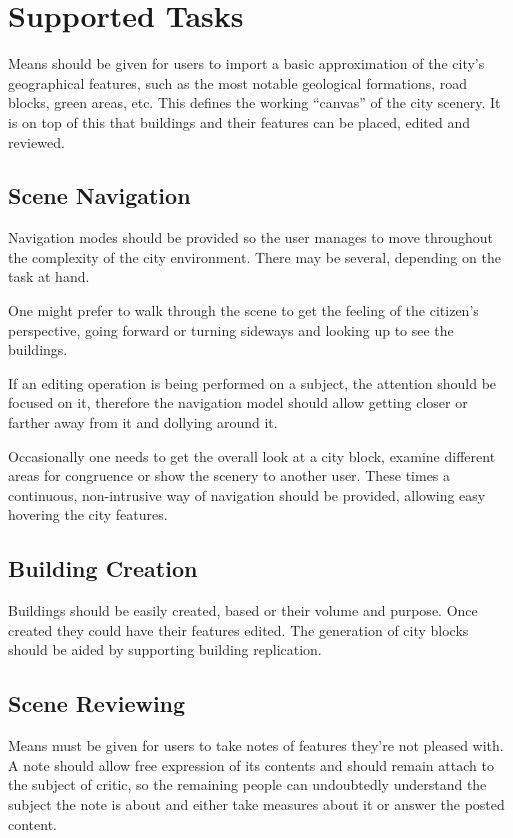

\section{Supported Tasks}

Means should be given for users to import a basic approximation of the
city's geographical features, such as the most notable geological formations,
road blocks, green areas, etc.
This defines the working ``canvas'' of the city scenery.
It is on top of this that buildings and their features can be placed, edited and reviewed.


\subsection{Scene Navigation}

Navigation modes should be provided so the user manages
to move throughout the complexity of the city environment.
There may be several, depending on the task at hand.

One might prefer to walk through the scene to get the feeling of the citizen's perspective,
going forward or turning sideways and looking up to see the buildings.

If an editing operation is being performed on a subject, the attention should be focused on it,
therefore the navigation model should allow getting closer or farther away from it and dollying around it.

Occasionally one needs to get the overall look at a city block, examine different areas for congruence
or show the scenery to another user. These times a continuous, non-intrusive way of navigation should be provided,
allowing easy hovering the city features.


\subsection{Building Creation}

Buildings should be easily created, based or their volume and purpose.
Once created they could have their features edited.
The generation of city blocks should be aided by supporting building replication.


\subsection{Scene Reviewing}

Means must be given for users to take notes of features they're not pleased with.
A note should allow free expression of its contents and should remain attach to the
subject of critic, so the remaining people can undoubtedly understand the subject
the note is about and either take measures about it or answer the posted content.


